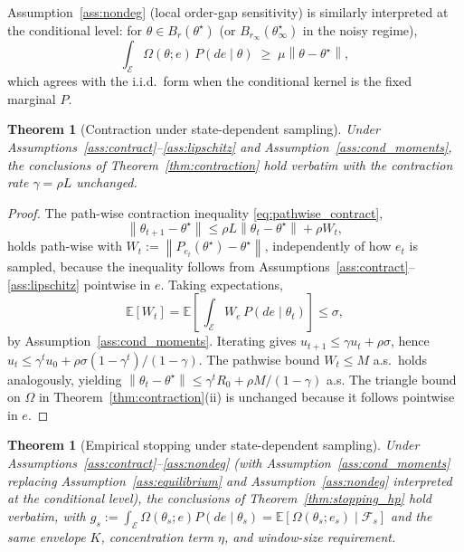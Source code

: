 \documentclass[12pt,a4paper]{article}
\newtheorem{theorem}[definition]{Theorem}
\newcommand{\E}{\mathcal{E}}
\newcommand{\norm}[1]{\left\lVert#1\right\rVert}
\newcommand{\Ogap}{\Omega}
\begin{document}
Assumption~\ref{ass:nondeg} (local order-gap sensitivity) is similarly
interpreted at the conditional level: for $\theta \in B_r(\theta^\star)$
(or $B_{r_\infty}(\theta^\star_\infty)$ in the noisy regime),
\[
  \int_\E \Ogap(\theta; e) \, P(de \mid \theta) \;\geq\; \mu \norm{\theta - \theta^\star},
\]
which agrees with the i.i.d.\ form when the conditional kernel is the fixed
marginal $P$.

\begin{theorem}[Contraction under state-dependent sampling]
\label{thm:contraction_cond}
Under Assumptions~\ref{ass:contract}--\ref{ass:lipschitz} and
Assumption~\ref{ass:cond_moments}, the conclusions of
Theorem~\ref{thm:contraction} hold verbatim with the contraction rate
$\gamma = \rho L$ unchanged.
\end{theorem}

\begin{proof}
The path-wise contraction inequality \eqref{eq:pathwise_contract},
\[
  \norm{\theta_{t+1} - \theta^\star}
  \leq \rho L \norm{\theta_t - \theta^\star} + \rho W_t,
\]
holds path-wise with $W_t := \norm{P_{e_t}(\theta^\star) - \theta^\star}$,
independently of how $e_t$ is sampled, because the inequality follows from
Assumptions~\ref{ass:contract}--\ref{ass:lipschitz} pointwise in $e$. Taking
expectations,
\[
  \mathbb{E}[W_t]
  = \mathbb{E}\!\left[\,\int_\E W_e \, P(de \mid \theta_t)\right]
  \leq \sigma,
\]
by Assumption~\ref{ass:cond_moments}. Iterating gives
$u_{t+1} \leq \gamma u_t + \rho\sigma$, hence
$u_t \leq \gamma^t u_0 + \rho\sigma(1 - \gamma^t)/(1-\gamma)$. The pathwise
bound $W_t \leq M$ a.s.\ holds analogously, yielding
$\norm{\theta_t - \theta^\star} \leq \gamma^t R_0 + \rho M /(1-\gamma)$ a.s.
The triangle bound on $\Ogap$ in Theorem~\ref{thm:contraction}(ii) is
unchanged because it follows pointwise in $e$. \qedhere
\end{proof}

\begin{theorem}[Empirical stopping under state-dependent sampling]
\label{thm:stopping_cond}
Under Assumptions~\ref{ass:contract}--\ref{ass:nondeg} (with
Assumption~\ref{ass:cond_moments} replacing
Assumption~\ref{ass:equilibrium} and Assumption~\ref{ass:nondeg}
interpreted at the conditional level), the conclusions of
Theorem~\ref{thm:stopping_hp} hold verbatim, with $g_s := \int_\E
\Ogap(\theta_s; e) P(de \mid \theta_s) = \mathbb{E}[\Ogap(\theta_s; e_s) \mid
\mathcal{F}_s]$ and the same envelope $K$, concentration term $\eta$, and
window-size requirement.
\end{theorem}
\end{document}
